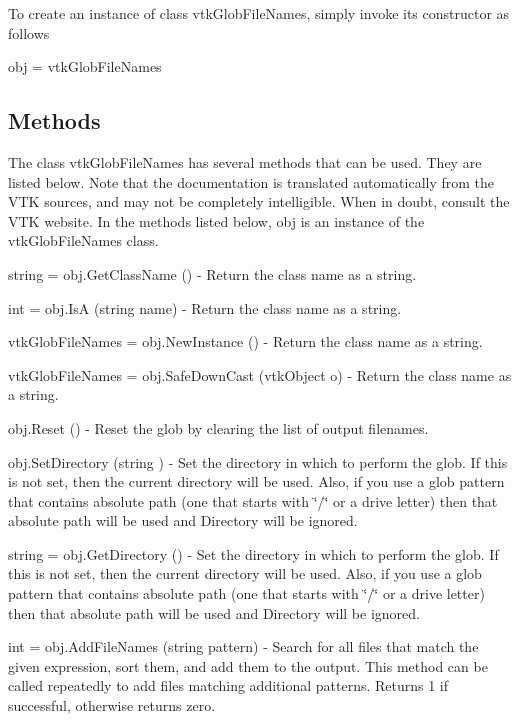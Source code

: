 To create an instance of class vtk\-Glob\-File\-Names, simply invoke its constructor as follows \begin{DoxyVerb}  obj = vtkGlobFileNames
\end{DoxyVerb}
 \hypertarget{vtkwidgets_vtkxyplotwidget_Methods}{}\subsection{Methods}\label{vtkwidgets_vtkxyplotwidget_Methods}
The class vtk\-Glob\-File\-Names has several methods that can be used. They are listed below. Note that the documentation is translated automatically from the V\-T\-K sources, and may not be completely intelligible. When in doubt, consult the V\-T\-K website. In the methods listed below, {\ttfamily obj} is an instance of the vtk\-Glob\-File\-Names class. 
\begin{DoxyItemize}
\item {\ttfamily string = obj.\-Get\-Class\-Name ()} -\/ Return the class name as a string.  
\item {\ttfamily int = obj.\-Is\-A (string name)} -\/ Return the class name as a string.  
\item {\ttfamily vtk\-Glob\-File\-Names = obj.\-New\-Instance ()} -\/ Return the class name as a string.  
\item {\ttfamily vtk\-Glob\-File\-Names = obj.\-Safe\-Down\-Cast (vtk\-Object o)} -\/ Return the class name as a string.  
\item {\ttfamily obj.\-Reset ()} -\/ Reset the glob by clearing the list of output filenames.  
\item {\ttfamily obj.\-Set\-Directory (string )} -\/ Set the directory in which to perform the glob. If this is not set, then the current directory will be used. Also, if you use a glob pattern that contains absolute path (one that starts with \char`\"{}/\char`\"{} or a drive letter) then that absolute path will be used and Directory will be ignored.  
\item {\ttfamily string = obj.\-Get\-Directory ()} -\/ Set the directory in which to perform the glob. If this is not set, then the current directory will be used. Also, if you use a glob pattern that contains absolute path (one that starts with \char`\"{}/\char`\"{} or a drive letter) then that absolute path will be used and Directory will be ignored.  
\item {\ttfamily int = obj.\-Add\-File\-Names (string pattern)} -\/ Search for all files that match the given expression, sort them, and add them to the output. This method can be called repeatedly to add files matching additional patterns. Returns 1 if successful, otherwise returns zero.  

\end{DoxyItemize}
